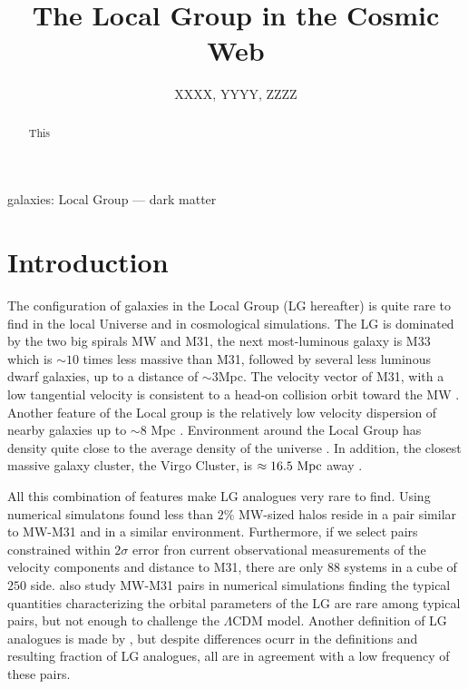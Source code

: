 \documentclass{emulateapj}
\newcommand{\lcdm}{$\Lambda$CDM }
\newcommand{\mpc}{\rm{Mpc}}
\newcommand{\hmpc}{{\ifmmode{h^{-1}{\rm Mpc}}\else{$h^{-1}$Mpc }\fi}}
\begin{document}
\title{The Local Group in the Cosmic Web} 
\author{
  XXXX,
  YYYY,
  ZZZZ
}

\begin{abstract}
This
\end{abstract}

\begin{keywords}
{galaxies: Local Group --- dark matter}
\end{keywords}


\section{Introduction}
\label{sec:intro}

The configuration of galaxies in the Local Group (LG hereafter) is quite rare to find in the local Universe and in cosmological simulations. 
The LG is dominated by the two big spirals MW and M31, the next most-luminous galaxy is M33 which is $\sim 10$ times less massive than M31, followed by several less luminous dwarf galaxies, up to a distance of $\sim 3$\mpc.
The velocity vector of M31, with a low tangential velocity is consistent to a head-on collision orbit toward the MW \citep{2008MNRAS.386..461C,2012ApJ...753....8V,2012ApJ...753....7S}.
Another feature of the Local group is the relatively low velocity dispersion of nearby galaxies up to $\sim 8$ Mpc \citep[][and references therein]{1975ApJ...196..313S,2011MNRAS.415L..16A}.
Environment around the Local Group has density quite
close to the average density of the universe \citep{2003ApJ...596...19K,2005AJ....129..178K}. In addition, the closest massive galaxy cluster, the Virgo Cluster, is $\approx 16.5\ \mpc$ away \citep{2007ApJ...655..144M}.

All this combination of features make LG analogues very rare to find. Using numerical simulatons \citet{lganalogues} found less than $2\%$ MW-sized halos reside in a pair similar to MW-M31 and in a similar environment. Furthermore, if we select pairs constrained within $2\sigma$ error fron current observational measurements of the velocity components and distance to M31, there are only $88$ systems in a cube of $250$ \hmpc side.
\citet{2013ApJ...767L...5F} also study MW-M31 pairs in numerical simulations finding the typical quantities characterizing the orbital parameters of the LG are rare among typical pairs, but not enough to challenge the \lcdm model.
Another definition of LG analogues is made by \citet{2008MNRAS.384.1459L}, but despite differences ocurr in the definitions and resulting fraction of LG analogues, all are in agreement with a low frequency of these pairs.
\end{document}
